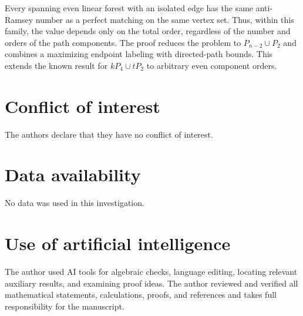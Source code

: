 \documentclass[12pt]{article}
\begin{document}
Every spanning even linear forest with an isolated edge has the same
anti-Ramsey number as a perfect matching on the same vertex set.
Thus, within this family, the value depends only on the total order,
regardless of the number and orders of the path components. The proof
reduces the problem to $P_{n-2}\cup P_2$ and combines a maximizing
endpoint labeling with directed-path bounds. This extends the known
result for $kP_4\cup tP_2$ to arbitrary even component orders.

\section*{Conflict of interest}
The authors declare that they have no conflict of interest.

\section*{Data availability} 

No data was used in this investigation.


\section*{Use of artificial intelligence}

The author used AI tools for algebraic checks, language editing,
locating relevant auxiliary results, and examining proof ideas.
The author reviewed and verified all mathematical statements,
calculations, proofs, and references and takes full responsibility
for the manuscript.
\end{document}

